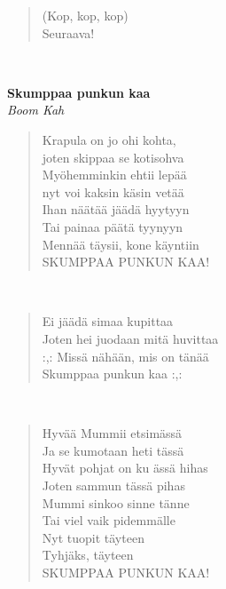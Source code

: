 \noindent\begin{minipage}{\linewidth}
\begin{verse}
	(Kop, kop, kop)\\
	Seuraava!\\
\end{verse}
\end{minipage}\\[10pt]
%
%
\noindent\begin{minipage}{\linewidth}
\vspace{5pt}
\parbox[t]{0.85\linewidth}{\raggedright {\large\bf Skumppaa punkun kaa}\\[2pt]\small\emph{Boom Kah}\\[6pt]}
\begin{verse}
	
	Krapula on jo ohi kohta,\\
	joten skippaa se kotisohva\\
	Myöhemminkin ehtii lepää\\
	nyt voi kaksin käsin vetää\\
	Ihan näätää jäädä hyytyyn\\
	Tai painaa päätä tyynyyn\\
	Mennää täysii, kone käyntiin\\
	SKUMPPAA PUNKUN KAA!\\
\end{verse}
\end{minipage}\\[10pt]
\noindent\begin{minipage}{\linewidth}
\begin{verse}
	Ei jäädä simaa kupittaa\\
	Joten hei juodaan mitä huvittaa\\
	\hspace{0pt-\widthof{:,: }}:,: Missä nähään, mis on tänää\\
	Skumppaa punkun kaa :,:\\
\end{verse}
\end{minipage}\\[10pt]
\noindent\begin{minipage}{\linewidth}
\begin{verse}
	Hyvää Mummii etsimässä\\
	Ja se kumotaan heti tässä\\
	Hyvät pohjat on ku ässä hihas\\
	Joten sammun tässä pihas\\
	Mummi sinkoo sinne tänne\\
	Tai viel vaik pidemmälle\\
	Nyt tuopit täyteen\\
	Tyhjäks, täyteen\\
	SKUMPPAA PUNKUN KAA!\\
\end{verse}
\end{minipage}\\[10pt]
